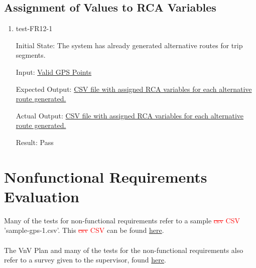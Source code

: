 \documentclass[12pt, titlepage]{article}
\begin{document}
\subsection{Assignment of Values to RCA Variables}
\begin{enumerate}
    \item test-FR12-1\label{test-FR12-1}
    
    Initial State: The system has already generated alternative routes for trip segments.
    
    Input: \href{https://github.com/paezha/PyERT-BLACK/blob/rev0-test/quarto-example/data/sample-gps/sample-gps-1.csv}{Valid GPS Points}
    
    Expected Output: \href{https://github.com/paezha/PyERT-BLACK/blob/rev0-test/test/test_data/fr-tests/fr12-1-expected.csv}{CSV file with assigned RCA variables for each alternative route generated.}
    
    Actual Output: \href{https://github.com/paezha/PyERT-BLACK/blob/rev0-test/test/test_data/fr-tests/fr12-1-out.csv}{CSV file with assigned RCA variables for each alternative route generated.}
    
    Result: Pass
\end{enumerate}

\section{Nonfunctional Requirements Evaluation}

Many of the tests for non-functional requirements refer to a sample \textcolor{red}{\sout{csv} CSV} 'sample-gps-1.csv'. This \textcolor{red}{\sout{csv} CSV} can be found \href{https://github.com/paezha/PyERT-BLACK/blob/main/quarto-example/data/sample-gps/sample-gps-1.csv}{here}.
\\ \\
The VnV Plan and many of the tests for the non-functional requirements also refer to a survey given to the supervisor, found \href{https://forms.gle/aJaBmjKrMnpH48Kb7}{here}.
\end{document}
